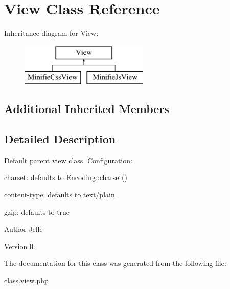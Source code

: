 \hypertarget{class_view}{\section{View Class Reference}
\label{class_view}
}
Inheritance diagram for View\-:\begin{figure}[H]
\begin{center}
\leavevmode
\includegraphics[height=2.000000cm]{class_view}
\end{center}
\end{figure}
\subsection*{Additional Inherited Members}


\subsection{Detailed Description}
Default parent view class. Configuration\-:
\begin{DoxyItemize}
\item charset\-: defaults to Encoding\-::charset()
\item content-\/type\-: defaults to text/plain
\item gzip\-: defaults to true
\end{DoxyItemize}

\begin{DoxyAuthor}{Author}
Jelle 
\end{DoxyAuthor}
\begin{DoxyVersion}{Version}
0.. 
\end{DoxyVersion}


The documentation for this class was generated from the following file\-:\begin{DoxyCompactItemize}
\item 
class.\-view.\-php\end{DoxyCompactItemize}
